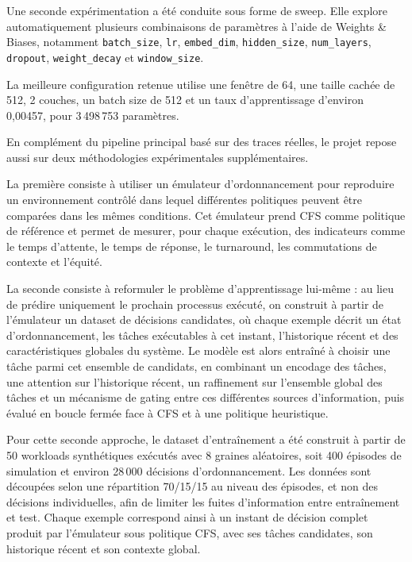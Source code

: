 \documentclass[letterpaper, 10 pt, conference]{ieeeconf}  %
\begin{document}

Une seconde expérimentation a été conduite sous forme de sweep. Elle explore automatiquement plusieurs combinaisons de paramètres à l'aide de Weights \& Biases, notamment \texttt{batch\_size}, \texttt{lr}, \texttt{embed\_dim}, \texttt{hidden\_size}, \texttt{num\_layers}, \texttt{dropout}, \texttt{weight\_decay} et \texttt{window\_size}.

La meilleure configuration retenue utilise une fenêtre de 64, une taille cachée de 512, 2 couches, un batch size de 512 et un taux d'apprentissage d'environ 0,00457, pour 3\,498\,753 paramètres.



En complément du pipeline principal basé sur des traces réelles, le projet repose aussi sur deux méthodologies expérimentales supplémentaires. 

La première consiste à utiliser un émulateur d'ordonnancement pour reproduire un environnement contrôlé dans lequel différentes politiques peuvent être comparées dans les mêmes conditions. Cet émulateur prend CFS comme politique de référence et permet de mesurer, pour chaque exécution, des indicateurs comme le temps d'attente, le temps de réponse, le turnaround, les commutations de contexte et l'équité. 

La seconde consiste à reformuler le problème d'apprentissage lui-même : au lieu de prédire uniquement le prochain processus exécuté, on construit à partir de l'émulateur un dataset de décisions candidates, où chaque exemple décrit un état d'ordonnancement, les tâches exécutables à cet instant, l'historique récent et des caractéristiques globales du système. Le modèle est alors entraîné à choisir une tâche parmi cet ensemble de candidats, en combinant un encodage des tâches, une attention sur l'historique récent, un raffinement sur l'ensemble global des tâches et un mécanisme de gating entre ces différentes sources d'information, puis évalué en boucle fermée face à CFS et à une politique heuristique.

Pour cette seconde approche, le dataset d'entraînement a été construit à partir de 50 workloads synthétiques exécutés avec 8 graines aléatoires, soit 400 épisodes de simulation et environ 28\,000 décisions d'ordonnancement. Les données sont découpées selon une répartition 70/15/15 au niveau des épisodes, et non des décisions individuelles, afin de limiter les fuites d'information entre entraînement et test. Chaque exemple correspond ainsi à un instant de décision complet produit par l'émulateur sous politique CFS, avec ses tâches candidates, son historique récent et son contexte global.
\end{document}

